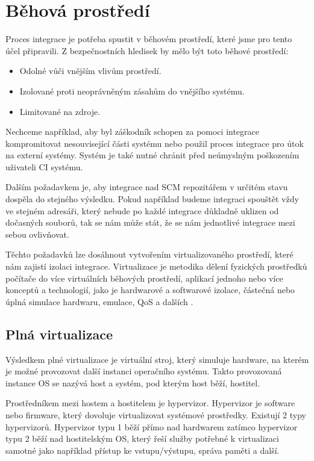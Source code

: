 \section{Běhová prostředí}

Proces integrace je potřeba spustit v běhovém prostředí, které jsme pro tento účel připravili.
Z bezpečnostních hledisek by mělo být toto běhové prostředí:

\begin{itemize}
	\item Odolné vůči vnějším vlivům prostředí.
	\item Izolované proti neoprávněným zásahům do vnějšího systému.
	\item Limitované na zdroje.
\end{itemize}

Nechceme například, aby byl záškodník schopen za pomoci integrace kompromitovat nesouvisející části systému nebo použil proces integrace pro útok na externí systémy.
Systém je také nutné chránit před neúmyslným poškozením uživateli CI systému.

Dalším požadavkem je, aby integrace nad SCM repozitářem v určitém stavu dospěla do stejného výsledku.
Pokud například budeme integraci spouštět vždy ve stejném adresáři, který nebude po každé integrace důkladně uklizen od dočasných souborů, tak se nám může stát, že se nám jednotlivé integrace mezi sebou ovlivňovat.

Těchto požadavků lze dosáhnout vytvořením virtualizovaného prostředí, které nám zajistí izolaci integrace.
Virtualizace je metodika dělení fyzických prostředků počítače do více virtuálních běhových prostředí, aplikací jednoho nebo více konceptů a technologií, jako je hardwarové a softwarové izolace, částečná nebo úplná simulace hardwaru, emulace, QoS a dalších \cite{virt_intro}.

\subsection{Plná virtualizace}

Výsledkem plné virtualizace je virtuální stroj, který simuluje hardware, na kterém je možné provozovat další instanci operačního systému.
Takto provozovaná instance OS se nazývá host a systém, pod kterým host běží, hostitel.

Prostředníkem mezi hostem a hostitelem je hypervizor.
Hypervizor je software nebo firmware, který dovoluje virtualizovat systémové prostředky.
Existují 2 typy hypervizorů.
Hypervizor typu 1 běží přímo nad hardwarem zatímco hypervizor typu 2 běží nad hostitelským OS, který řeší služby potřebné k virtualizaci samotné jako například přístup ke vstupu/výstupu, správa paměti a další.
\cite{hypervisor_def}

